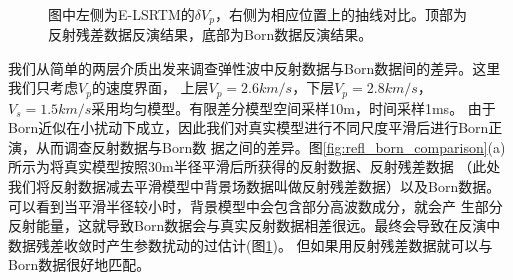 \begin{figure}
   \centering
   \\
   \caption{图中左侧为E-LSRTM的$\delta
	   V_p$，右侧为相应位置上的抽线对比。顶部为反射残差数据反演结果，底部为Born数据反演结果。}
   \label{fig:Vpcomparison}
\end{figure}

我们从简单的两层介质出发来调查弹性波中反射数据与Born数据间的差异。这里我们只考虑$V_p$的速度界面，
上层$V_p=2.6km/s$，下层$V_p=2.8km/s$， $V_s=1.5km/s$采用均匀模型。有限差分模型空间采样10m，时间采样1ms。
由于Born近似在小扰动下成立，因此我们对真实模型进行不同尺度平滑后进行Born正演，从而调查反射数据与Born数
据之间的差异。图\ref{fig:refl_born_comparison}(a)所示为将真实模型按照30m半径平滑后所获得的反射数据、反射残差数据
（此处我们将反射数据减去平滑模型中背景场数据叫做反射残差数据）以及Born数据。可以看到当平滑半径较小时，背景模型中会包含部分高波数成分，就会产
生部分反射能量，这就导致Born数据会与真实反射数据相差很远。最终会导致在反演中数据残差收敛时产生参数扰动的过估计(图\ref{fig:Vpcomparison})。
但如果用反射残差数据就可以与Born数据很好地匹配。

